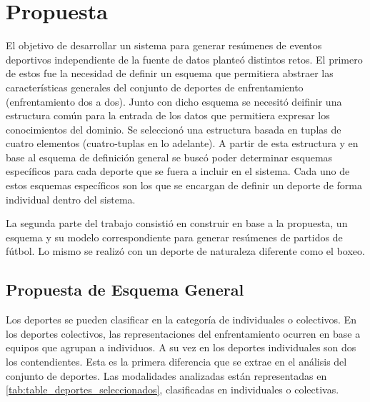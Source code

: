 \chapter{Propuesta}\label{chapter:proposal}
 
    El objetivo de desarrollar un sistema para generar resúmenes de eventos deportivos independiente de la fuente de datos 
planteó distintos retos. El primero de estos fue la necesidad de definir un esquema que permitiera abstraer las características 
generales del conjunto de deportes de enfrentamiento (enfrentamiento dos a dos). Junto con dicho esquema se necesitó 
deifinir una estructura común para la entrada de los datos que permitiera expresar los conocimientos del dominio. Se seleccionó 
una estructura basada en tuplas de cuatro elementos (cuatro-tuplas en lo adelante). A partir de esta estructura y en base 
al esquema de definición general se buscó poder determinar esquemas específicos para cada deporte que se fuera a incluir en el 
sistema. Cada uno de estos esquemas específicos son los que se encargan de definir un deporte de forma individual dentro del sistema.
    
    La segunda parte del trabajo consistió en construir en base a la propuesta, un esquema y su modelo correspondiente para generar 
resúmenes de partidos de fútbol. Lo mismo se realizó con un deporte de naturaleza diferente como el boxeo.

\section{Propuesta de Esquema General}

    Los deportes se pueden clasificar en la categoría de individuales o colectivos. En los deportes colectivos, las representaciones 
del enfrentamiento ocurren en base a equipos que agrupan a individuos. A su vez en los deportes individuales son dos los contendientes.
Esta es la primera diferencia que se extrae en el análisis del conjunto de deportes. Las modalidades analizadas están representadas en \ref{tab:table_deportes_seleccionados}, 
clasificadas en individuales o colectivas.

